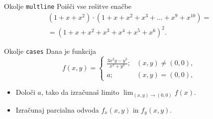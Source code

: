 \begin{frame}{Okolje \texttt{multline}}
	Poišči vse rešitve enačbe	
	\begin{multline*}
		(1+x+x^2) \cdot (1+x+x^2+x^3+\ldots+x^9+x^{10}) = \\
		=(1+x+x^2+x^3+x^4+x^5+x^6)^2.
	\end{multline*}	
\end{frame}

\begin{frame}{Okolje \texttt{cases}}
	Dana je funkcija
	$$
		f(x,y) =
		\begin{cases}
			 \frac{3x^2y-y^3}{x^2+y^2}; &(x,y)\ne (0,0), \\
			 a; & (x, y) = (0,0),
		\end{cases}
	$$	
	\begin{itemize}
	\item Določi $a$, tako da izračunaš limito \( \lim_{(x,y)\to(0,0)} f(x). \)
	\item Izračunaj parcialna odvoda $f_x(x,y)$ in $f_y(x,y)$.
	\end{itemize}
\end{frame}
